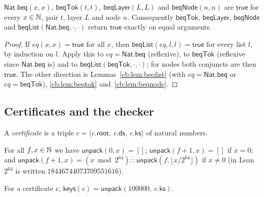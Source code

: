 \begin{lemma}\label{cb:lem:beq-refl}
$\mathsf{Nat.beq}(x,x)$, $\mathsf{beqTok}(t,t)$, $\mathsf{beqLayer}(L,L)$ and $\mathsf{beqNode}(n,n)$ are
$\mathsf{true}$ for every $x\in\mathbb N$, pair $t$, layer $L$ and node $n$. Consequently $\mathsf{beqTok}$,
$\mathsf{beqLayer}$, $\mathsf{beqNode}$ and $\mathsf{beqList}(\mathsf{Nat.beq},\cdot,\cdot)$ return $\mathsf{true}$
exactly on equal arguments.
\end{lemma}

\begin{proof}
If $eq(x,x)=\mathsf{true}$ for all $x$, then $\mathsf{beqList}(eq,l,l)=\mathsf{true}$ for every list $l$, by induction on
$l$. Apply this to $eq=\mathsf{Nat.beq}$ (reflexive), to $\mathsf{beqTok}$ (reflexive since $\mathsf{Nat.beq}$ is) and to
$\mathsf{beqList}(\mathsf{beqTok},\cdot,\cdot)$; for nodes both conjuncts are then $\mathsf{true}$. The other direction
is Lemmas~\ref{cb:lem:beqlist} (with $eq=\mathsf{Nat.beq}$ or $eq=\mathsf{beqTok}$), \ref{cb:lem:beqtok}
and~\ref{cb:lem:beqnode}.
\end{proof}

\subsection{Certificates and the checker}\label{cb:sec:checker}

\begin{definition}\label{cb:def:cert}
A \emph{certificate} is a triple $c=\langle c.\mathsf{root},\ c.\mathsf{ds},\ c.\mathsf{ks}\rangle$ of natural numbers.
\end{definition}

\begin{definition}\label{cb:def:unpack}
For all $f,x\in\mathbb N$ we have $\mathsf{unpack}(0,x)=[]$; $\mathsf{unpack}(f+1,x)=[]$ if $x=0$; and
$\mathsf{unpack}(f+1,x)=(x\bmod2^{64})\mathbin{::}\mathsf{unpack}(f,\lfloor x/2^{64}\rfloor)$ if $x\ne0$ (in Lean
$2^{64}$ is written $18446744073709551616$).
\end{definition}

\begin{definition}\label{cb:def:keys}
For a certificate $c$, $\mathsf{keys}(c)=\mathsf{unpack}(100000,\ c.\mathsf{ks})$.
\end{definition}

